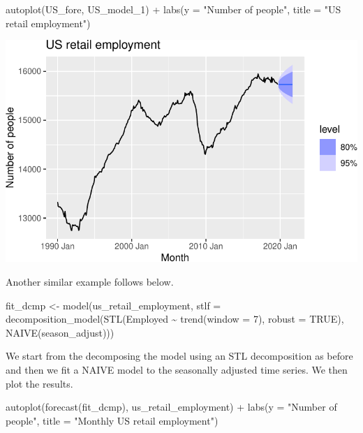 \documentclass[
  letterpaper,
  DIV=11,
  numbers=noendperiod]{scrartcl}
\newenvironment{Shaded}{\begin{snugshade}}{\end{snugshade}}
\newcommand{\AttributeTok}[1]{\textcolor[rgb]{0.40,0.45,0.13}{#1}}
\newcommand{\ConstantTok}[1]{\textcolor[rgb]{0.56,0.35,0.01}{#1}}
\newcommand{\DecValTok}[1]{\textcolor[rgb]{0.68,0.00,0.00}{#1}}
\newcommand{\FunctionTok}[1]{\textcolor[rgb]{0.28,0.35,0.67}{#1}}
\newcommand{\NormalTok}[1]{\textcolor[rgb]{0.00,0.23,0.31}{#1}}
\newcommand{\OtherTok}[1]{\textcolor[rgb]{0.00,0.23,0.31}{#1}}
\newcommand{\SpecialCharTok}[1]{\textcolor[rgb]{0.37,0.37,0.37}{#1}}
\newcommand{\StringTok}[1]{\textcolor[rgb]{0.13,0.47,0.30}{#1}}
\begin{document}
\begin{Shaded}
\begin{Highlighting}[]
\FunctionTok{autoplot}\NormalTok{(US\_fore, US\_model\_1) }\SpecialCharTok{+}
  \FunctionTok{labs}\NormalTok{(}\AttributeTok{y =} \StringTok{"Number of people"}\NormalTok{, }\AttributeTok{title =} \StringTok{"US retail employment"}\NormalTok{)}
\end{Highlighting}
\end{Shaded}

\begin{center}
\includegraphics{chapter5_review_files/figure-pdf/unnamed-chunk-41-1.pdf}
\end{center}

Another similar example follows below.

\begin{Shaded}
\begin{Highlighting}[]
\NormalTok{fit\_dcmp }\OtherTok{\textless{}{-}} \FunctionTok{model}\NormalTok{(us\_retail\_employment,}
    \AttributeTok{stlf =} \FunctionTok{decomposition\_model}\NormalTok{(}\FunctionTok{STL}\NormalTok{(Employed }\SpecialCharTok{\textasciitilde{}} \FunctionTok{trend}\NormalTok{(}\AttributeTok{window =} \DecValTok{7}\NormalTok{),}
          \AttributeTok{robust =} \ConstantTok{TRUE}\NormalTok{), }\FunctionTok{NAIVE}\NormalTok{(season\_adjust)))}
\end{Highlighting}
\end{Shaded}

We start from the decomposing the model using an STL decomposition as
before and then we fit a NAIVE model to the seasonally adjusted time
series. We then plot the results.

\begin{Shaded}
\begin{Highlighting}[]
\FunctionTok{autoplot}\NormalTok{(}\FunctionTok{forecast}\NormalTok{(fit\_dcmp), us\_retail\_employment) }\SpecialCharTok{+}
  \FunctionTok{labs}\NormalTok{(}\AttributeTok{y =} \StringTok{"Number of people"}\NormalTok{, }\AttributeTok{title =} \StringTok{"Monthly US retail employment"}\NormalTok{)}
\end{Highlighting}
\end{Shaded}
\end{document}
